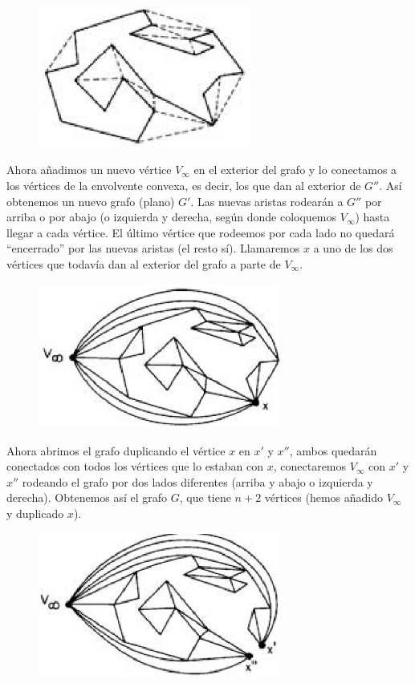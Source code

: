\documentclass{amsart}
\begin{document}
\begin{figure}[H]
	\includegraphics[width=70mm]{imgs/museo-g2}
\end{figure}

Ahora añadimos un nuevo vértice $V_\infty$ en el exterior del grafo y lo conectamos a los vértices de la envolvente convexa, es decir, los que dan al exterior de $G''$. Así obtenemos un nuevo grafo (plano) $G'$. Las nuevas aristas rodearán a $G''$ por arriba o por abajo (o izquierda y derecha, según donde coloquemos $V_\infty$) hasta llegar a cada vértice. El último vértice que rodeemos por cada lado no quedará ``encerrado'' por las nuevas aristas (el resto sí). Llamaremos $x$ a uno de los dos vértices que todavía dan al exterior del grafo a parte de $V_\infty$.

\begin{figure}[H]
	\includegraphics[width=80mm]{imgs/museo-g1}
\end{figure}

Ahora abrimos el grafo duplicando el vértice $x$ en $x'$ y $x''$, ambos quedarán conectados con todos los vértices que lo estaban con $x$, conectaremos $V_\infty$ con $x'$ y $x''$ rodeando el grafo por dos lados  diferentes (arriba y abajo o izquierda y derecha). Obtenemos así el grafo $G$, que tiene $n+2$ vértices (hemos añadido $V_\infty$ y duplicado $x$).

\begin{figure}[H]
	\includegraphics[width=80mm]{imgs/museo-g}
\end{figure}
\end{document}

